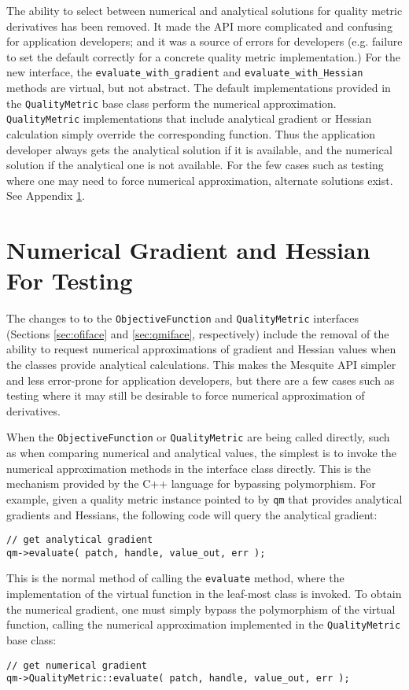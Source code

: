 \documentclass{article}
\begin{document}
The ability to select between numerical and analytical solutions for quality metric derivatives has been removed.  It made the API more complicated and confusing for application developers; and it was a source of errors for developers (e.g. failure to set the default correctly for a concrete quality metric implementation.)  For the new interface, the \texttt{evaluate\_with\_gradient} and \texttt{evaluate\_with\_Hessian} methods are virtual, but not abstract.  The default implementations provided in the \texttt{QualityMetric} base class perform the numerical approximation.  \texttt{QualityMetric} implementations that include analytical gradient or Hessian calculation simply override the corresponding function.  Thus the application developer always gets the analytical solution if it is available, and the numerical solution if the analytical one is not available.  For the few cases such as testing where one may need to force numerical approximation, alternate solutions exist. See Appendix \ref{sec:numeric}.


\section{Numerical Gradient and Hessian For Testing}
\label{sec:numeric}

The changes to to the \texttt{ObjectiveFunction} and \texttt{QualityMetric} interfaces (Sections \ref{sec:ofiface} and \ref{sec:qmiface}, respectively) include the removal of the ability to request numerical approximations of gradient and Hessian values when the classes provide analytical calculations.  This makes the Mesquite API simpler and less error-prone for application developers, but there are a few cases such as testing where it may still be desirable to force numerical approximation of derivatives.

When the \texttt{ObjectiveFunction} or \texttt{QualityMetric} are being called directly, such as when comparing numerical and analytical values, the simplest is to invoke the numerical approximation methods in the interface class directly.  This is the mechanism provided by the C++ language for bypassing polymorphism.  For example, given a quality metric instance pointed to by \texttt{qm} that provides analytical gradients and Hessians, the following code will query the analytical gradient:
\begin{lstlisting}
// get analytical gradient
qm->evaluate( patch, handle, value_out, err );
\end{lstlisting}
This is the normal method of calling the \texttt{evaluate} method, where the implementation of the virtual function in the leaf-most class is invoked.  To obtain the numerical gradient, one must simply bypass the polymorphism of the virtual function, calling the numerical approximation implemented in the \texttt{QualityMetric} base class:
\begin{lstlisting}
// get numerical gradient
qm->QualityMetric::evaluate( patch, handle, value_out, err );
\end{lstlisting}
\end{document}
